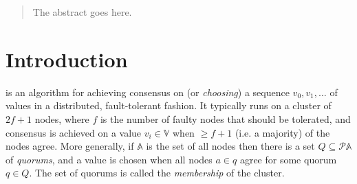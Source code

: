 \documentclass[journal]{IEEEtran}
\begin{document}







\maketitle

\begin{abstract}
The abstract goes here. %
\end{abstract}







%
\IEEEpeerreviewmaketitle

\section{Introduction}

 is an algorithm for achieving consensus on (or
\textit{choosing}) a sequence $v_0, v_1, \ldots$ of values in a distributed,
fault-tolerant fashion. It typically runs on a cluster of $2f+1$ nodes, where
$f$ is the number of faulty nodes that should be tolerated, and consensus is
achieved on a value $v_i \in \mathbb V$ when $\ge f+1$ (i.e.  a majority) of
the nodes agree.  More generally, if $\mathbb A$ is the set of all nodes then
there is a set $Q \subseteq \mathcal P \mathbb A$ of \textit{quorums}, and a
value is chosen when all nodes $a \in q$ agree for some quorum $q \in Q$. The
set of quorums is called the \textit{membership} of the cluster.
\end{document}
